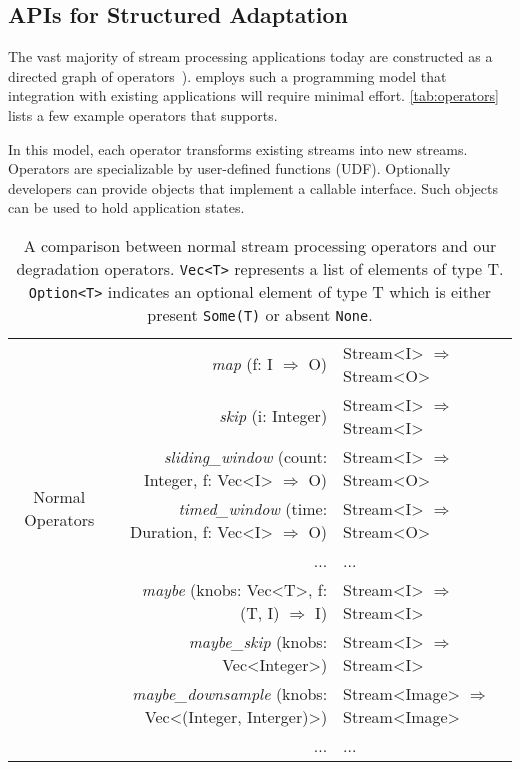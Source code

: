 \subsection{APIs for Structured Adaptation}
\label{sec:struct-adapt}

The vast majority of stream processing applications today are constructed as a
directed graph of operators~\cite{toshniwal2014storm, zaharia2013discretized}).
\sysname{} employs such a programming model that integration with existing
applications will require minimal effort. \autoref{tab:operators} lists a few
example operators that \sysname{} supports.

In this model, each operator transforms existing streams into new
streams. Operators are specializable by user-defined functions (UDF). Optionally
developers can provide objects that implement a callable interface. Such objects
can be used to hold application states.

\begin{table*}
  \footnotesize
  \centering
  \begin{tabular}{ c r l }
    \toprule
    \multirow{7}{*}{Normal Operators}
    & \textit{map} (f: I $\Rightarrow$ O) & Stream<I> $\Rightarrow$ Stream<O> \\
    & \textit{skip} (i: Integer) & Stream<I> $\Rightarrow$
                                   Stream<I> \\
    & \textit{sliding\_window} (count: Integer, f: Vec<I> $\Rightarrow$ O) & Stream<I> $\Rightarrow$
                                                                            Stream<O> \\
    & \textit{timed\_window} (time: Duration, f: Vec<I> $\Rightarrow$ O) & Stream<I> $\Rightarrow$
                                                                          Stream<O> \\
    & ... & ... \\
    \midrule
    \multirow{4}{*}{Degradation Operators}
    & \textit{maybe} (knobs: Vec<T>, f:  (T, I) $\Rightarrow$ I) & Stream<I> $\Rightarrow$
                                                                 Stream<I> \\
    & \textit{maybe\_skip} (knobs: Vec<Integer>) & Stream<I> $\Rightarrow$ Stream<I> \\
    & \textit{maybe\_downsample} (knobs: Vec<(Integer, Interger)>) & Stream<Image> $\Rightarrow$ Stream<Image> \\
    & ... & ... \\
    \bottomrule
  \end{tabular}
  \caption{A comparison between normal stream processing operators and our
    degradation operators. \texttt{Vec<T>} represents a list of elements of type
    T. \texttt{Option<T>} indicates an optional element of type T which is
    either present \texttt{Some(T)} or absent \texttt{None}.}
  \label{tab:operators}
\end{table*}

